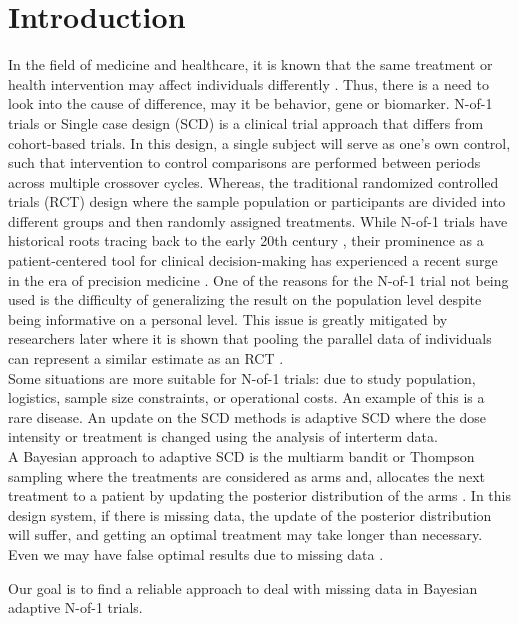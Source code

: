 \chapter{Introduction}

In the field of medicine and healthcare, it is known that the same treatment or health intervention may affect individuals differently \cite{Schork2023}. Thus, there is a need 
to look into the cause of difference, may it be behavior, gene or biomarker. N-of-1 trials or Single case design (SCD) is a clinical trial approach that differs from 
cohort-based trials. In this design, a single subject will serve as one's own control, such that intervention to control comparisons are performed between periods across multiple crossover cycles. Whereas, 
the traditional randomized controlled trials (RCT) design where the sample population or participants are divided into different groups and then 
randomly assigned treatments. While N-of-1 trials have historical roots tracing back to the early 20th century \cite{Mirza2017}, their prominence as a patient-centered tool for 
clinical decision-making has experienced a recent surge in the era of precision medicine \cite{schork2015personalized}. One of the reasons for the N-of-1 trial not being used is the difficulty of generalizing 
the result on the population level despite being informative on a personal level. This issue is greatly mitigated by researchers later where it is shown that pooling the parallel data of individuals 
can represent a similar estimate as an RCT \cite{zucker1997combining}. 
\\ Some situations are more suitable for N-of-1 trials: due to study population, 
logistics, sample size constraints, or operational costs. An example of this is a rare disease. An update on the SCD methods is 
adaptive SCD where the dose intensity or treatment is changed using the analysis of interterm data. \\
A Bayesian approach to adaptive SCD is the multiarm bandit or Thompson sampling where the treatments are considered as 
arms and, allocates the next treatment to a patient by updating the posterior distribution of the arms \cite{Shrestha2021}. In this design 
system, if there is missing data, the update of the posterior distribution will suffer, and getting an optimal treatment 
may take longer than necessary. Even we may have false optimal results due to missing data \cite{Chen2022}.

Our goal is to find a reliable approach to deal with missing data in Bayesian adaptive N-of-1 trials.

